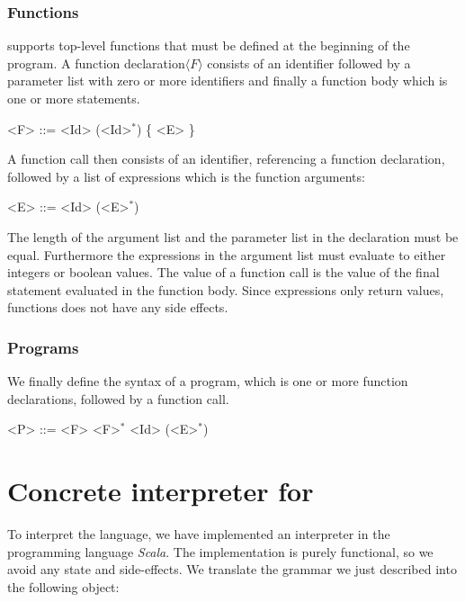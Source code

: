 \subsubsection{Functions}
\explanguage supports top-level functions that must be defined at the beginning of the program. A function declaration$\langle F \rangle$ consists of an identifier followed by a parameter list with zero or more identifiers and finally a function body which is one or more statements.

\begin{grammar}
	<F> ::= <Id> (<Id>$^{*}$) \{ <E> \}
\end{grammar}

A function call then consists of an identifier, referencing a function declaration, followed by a list of expressions which is the function arguments:

\begin{grammar}
	<E> ::= <Id> (<E>$^{*}$) 
\end{grammar}

The length of the argument list and the parameter list in the declaration must be equal. Furthermore the expressions in the argument list must evaluate to either integers or  boolean values.
The value of a function call is the value of the final statement evaluated in the function body. Since expressions only return values, functions does not have any side effects.


\subsubsection{Programs}
We finally define the syntax of a \explanguage program, which is one or more function declarations, followed by a function call. 

\begin{grammar}
	<P> ::= <F> <F>$^{*}$  <Id> (<E>$^{*}$) 
\end{grammar}

\fi
\section{Concrete interpreter for \explanguage}
To interpret the language, we have implemented an interpreter in the programming language \textsl{Scala}. The implementation is purely functional, so we avoid any state and side-effects. We translate the grammar we just described into the following object:

